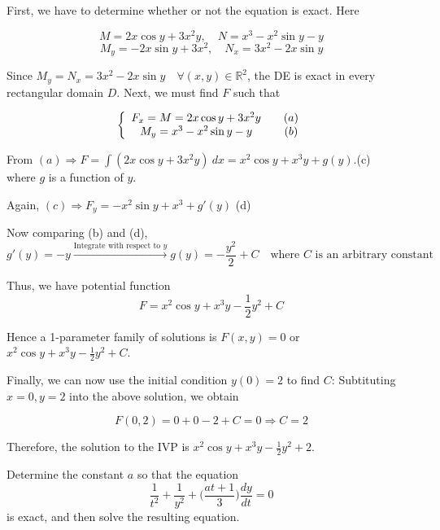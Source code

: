\begin{solution}
    First, we have to determine whether or not the equation is exact. Here 

    \[
        M = 2x\cos y + 3x^2y, \quad N = x^3 - x^2\sin y - y
    \]
    \[
        M_y = -2x\sin y + 3x^2, \quad N_x = 3x^2 - 2x\sin y
    \]

    Since $M_y = N_x = 3x^2 - 2x\sin y \quad \forall (x, y) \in \mathbb{R}^2$, the DE is exact in every rectangular
    domain $D$. Next, we must find $F$ such that

    \[
        \left\{
        \begin{array}{cc}
         F_x = M = 2x\cos y + 3x^2y & \quad \refstepcounter{equation}(a)\\
         M_y = x^3 - x^2\sin y - y & \quad \refstepcounter{equation}(b)
        \end{array}
        \right.
        \]
    
        From $(a) \Rightarrow F = \int (2x\cos y + 3x^2y)\> dx = x^2\cos y + x^3y + g(y)$.\quad (c)\\
        where $g$ is a function of $y$.

        Again, $(c) \Rightarrow F_y = -x^2\sin y + x^3 + g'(y)$ \quad (d)

        Now comparing (b) and (d), 
        \[
            g'(y) = -y \xrightarrow[]{\text{Integrate with respect to } y} g(y) = -\frac{y^2}{2} + C \quad 
            \text{where } C \text{ is an arbitrary constant}
        \]

        Thus, we have potential function 
        \[
            F = x^2\cos y + x^3y - \frac{1}{2}y^2 + C
        \]

        Hence a 1-parameter family of solutions is $F(x,y) = 0$ or 
        $\displaystyle x^2\cos y + x^3y - \frac{1}{2}y^2 + C$.

        Finally, we can now use the initial condition $y(0) = 2$ to find $C$: Subtituting 
        $x = 0, y = 2$ into the above solution, we obtain

        \[
            F(0, 2) = 0 + 0 - 2 + C = 0 \Rightarrow C = 2
        \]

        Therefore, the solution to the IVP is $\displaystyle x^2\cos y + x^3y - \frac{1}{2}y^2 + 2$.
\end{solution}

\begin{example}
    Determine the constant $a$ so that the equation 
    \[
        \frac{1}{t^2} + \frac{1}{y^2} + \biggl(\frac{at+1}{3}\biggr) \frac{dy}{dt} = 0
    \]
    is exact, and then solve the resulting equation.
\end{example}

